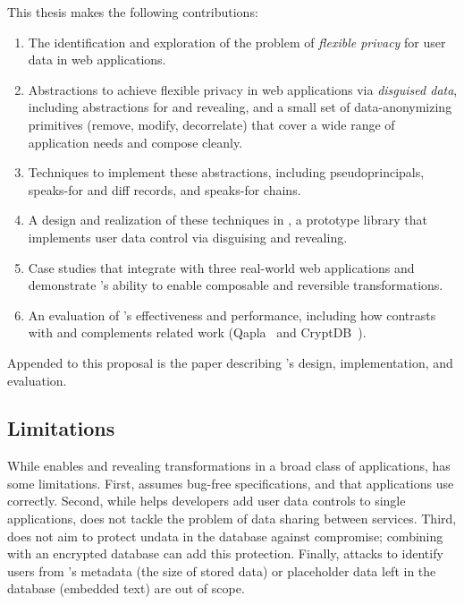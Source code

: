 \label{sec:intro:contrib}
%
This thesis makes the following contributions: 
\begin{enumerate}[nosep]
    \item The identification and exploration of the problem of \emph{flexible
        privacy} for user data in web applications.

    \item Abstractions to achieve flexible privacy in web applications via \emph{disguised data},
        including abstractions for \xxing and revealing, and a small set of
        data-anonymizing primitives (remove, modify, decorrelate) that cover a
        wide range of application needs and compose cleanly.

    \item Techniques to implement these abstractions, including
    pseudoprincipals, speaks-for and diff
    records, and speaks-for chains.

    \item A design and realization of these techniques in \sys, a prototype
        library that implements user data control via disguising and revealing.

    \item Case studies that integrate \sys with three real-world web
    applications and demonstrate \sys's ability to enable composable and
    reversible transformations.

    \item An evaluation of \sys's effectiveness and performance, including how
    \sys contrasts with and complements related work (Qapla~\cite{qapla} and
    CryptDB~\cite{cryptdb}).  
\end{enumerate}
%
Appended to this proposal is the \sys paper describing \sys's design, implementation, and evaluation.

\subsection{Limitations}
%
While \sys enables \xxing and revealing transformations in a broad class of
applications, \sys has some limitations.
%
First, \sys assumes bug-free \xx specifications, and that applications use \sys
correctly.
%
Second, while \sys helps developers add user data controls to single applications,
\sys does not tackle the problem of data sharing between services.
%
Third, \sys does not aim to protect un\xxed data in the database against compromise;
combining \sys with an encrypted database can add this protection.
%
Finally, attacks to identify users from \sys's metadata (\eg the size of
stored \xxed data) or placeholder data left in the database (\eg embedded text)
are out of scope.
%


